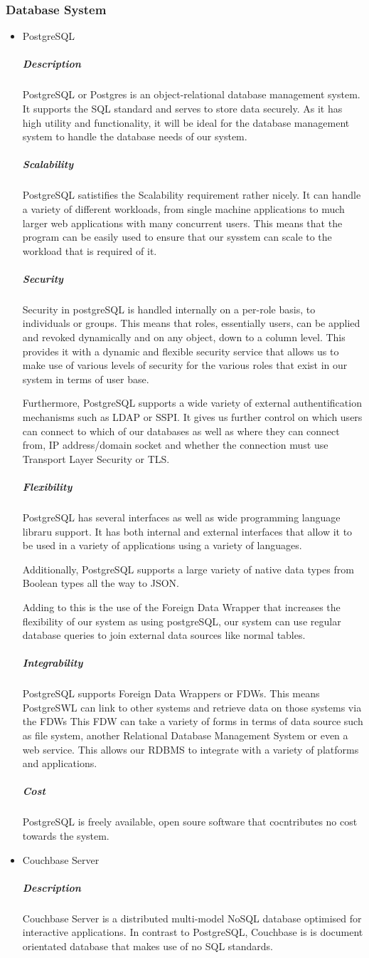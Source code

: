 \documentclass[a4paper,10pt]{article}
\begin{document}
\subsubsection{Database System}
	\begin{itemize}
		\item PostgreSQL
			\subparagraph{Description}
			PostgreSQL or Postgres is an object-relational database management system. It supports the SQL standard and serves to store data securely.
			As it has high utility and functionality, it will be ideal for the database management system to handle the database needs of our system.
			\subparagraph{Scalability}
			PostgreSQL satistifies the Scalability requirement rather nicely. It can handle a variety of different workloads, from single machine applications to much larger web applications with many concurrent users. This means that the program can be easily used to ensure that our sysstem can scale to the workload that is required of it.
			\subparagraph{Security}
			Security in postgreSQL is handled internally on a per-role basis, to individuals or groups. This means that roles, essentially users, can be applied and revoked dynamically and on any object, down to a column level. This provides it with a dynamic and flexible security service that allows us to make use of various levels of security for the various roles that exist in our system in terms of user base.

			Furthermore, PostgreSQL supports a wide variety of external authentification mechanisms such as LDAP or SSPI. It gives us further control on which users can connect to which of our databases as well as where they can connect from, IP address/domain socket and whether the connection must use Transport Layer Security or TLS.
			\subparagraph{Flexibility}
			PostgreSQL has several interfaces as well as wide programming language libraru support. It has both internal and external interfaces that allow it to be used in a variety of applications using a variety of languages.

			Additionally, PostgreSQL supports a large variety of native data types from Boolean types all the way to JSON.

			Adding to this is the use of the Foreign Data Wrapper that increases the flexibility of our system as using postgreSQL, our system can use regular database queries to join external data sources like normal tables.
			\subparagraph{Integrability}
			PostgreSQL supports Foreign Data Wrappers or FDWs. This means PostgreSWL can link to other systems and retrieve data on those systems via the FDWs This FDW can take a variety of forms in terms of data source such as file system, another Relational Database Management System or even a web service. This allows our RDBMS to integrate with a variety of platforms and applications. 
			\subparagraph{Cost}
			PostgreSQL is freely available, open soure software that cocntributes no cost towards the system.
		\item Couchbase Server
			\subparagraph{Description}
			Couchbase Server is a distributed multi-model NoSQL database optimised for interactive applications. In contrast to PostgreSQL, Couchbase is is document orientated database that makes use of no SQL standards.


\end{itemize}
\end{document}
